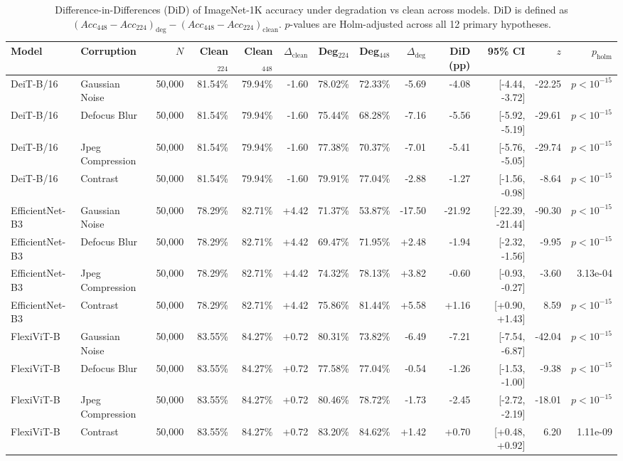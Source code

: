 \begin{table}[t]
\centering
\small
\begin{tabular}{llrrrrrrrrrrr}
\toprule
Model & Corruption & $N$ & Clean$_{224}$ & Clean$_{448}$ & $\Delta_{\text{clean}}$ & Deg$_{224}$ & Deg$_{448}$ & $\Delta_{\text{deg}}$ & DiD (pp) & 95\% CI & $z$ & $p_{\text{holm}}$ \\
\midrule
DeiT-B/16 & Gaussian Noise & 50,000 & 81.54\% & 79.94\% & -1.60 & 78.02\% & 72.33\% & -5.69 & -4.08 & [-4.44, -3.72] & -22.25 & $p < 10^{-15}$ \\
DeiT-B/16 & Defocus Blur & 50,000 & 81.54\% & 79.94\% & -1.60 & 75.44\% & 68.28\% & -7.16 & -5.56 & [-5.92, -5.19] & -29.61 & $p < 10^{-15}$ \\
DeiT-B/16 & Jpeg Compression & 50,000 & 81.54\% & 79.94\% & -1.60 & 77.38\% & 70.37\% & -7.01 & -5.41 & [-5.76, -5.05] & -29.74 & $p < 10^{-15}$ \\
DeiT-B/16 & Contrast & 50,000 & 81.54\% & 79.94\% & -1.60 & 79.91\% & 77.04\% & -2.88 & -1.27 & [-1.56, -0.98] & -8.64 & $p < 10^{-15}$ \\
EfficientNet-B3 & Gaussian Noise & 50,000 & 78.29\% & 82.71\% & +4.42 & 71.37\% & 53.87\% & -17.50 & -21.92 & [-22.39, -21.44] & -90.30 & $p < 10^{-15}$ \\
EfficientNet-B3 & Defocus Blur & 50,000 & 78.29\% & 82.71\% & +4.42 & 69.47\% & 71.95\% & +2.48 & -1.94 & [-2.32, -1.56] & -9.95 & $p < 10^{-15}$ \\
EfficientNet-B3 & Jpeg Compression & 50,000 & 78.29\% & 82.71\% & +4.42 & 74.32\% & 78.13\% & +3.82 & -0.60 & [-0.93, -0.27] & -3.60 & 3.13e-04 \\
EfficientNet-B3 & Contrast & 50,000 & 78.29\% & 82.71\% & +4.42 & 75.86\% & 81.44\% & +5.58 & +1.16 & [+0.90, +1.43] & 8.59 & $p < 10^{-15}$ \\
FlexiViT-B & Gaussian Noise & 50,000 & 83.55\% & 84.27\% & +0.72 & 80.31\% & 73.82\% & -6.49 & -7.21 & [-7.54, -6.87] & -42.04 & $p < 10^{-15}$ \\
FlexiViT-B & Defocus Blur & 50,000 & 83.55\% & 84.27\% & +0.72 & 77.58\% & 77.04\% & -0.54 & -1.26 & [-1.53, -1.00] & -9.38 & $p < 10^{-15}$ \\
FlexiViT-B & Jpeg Compression & 50,000 & 83.55\% & 84.27\% & +0.72 & 80.46\% & 78.72\% & -1.73 & -2.45 & [-2.72, -2.19] & -18.01 & $p < 10^{-15}$ \\
FlexiViT-B & Contrast & 50,000 & 83.55\% & 84.27\% & +0.72 & 83.20\% & 84.62\% & +1.42 & +0.70 & [+0.48, +0.92] & 6.20 & 1.11e-09 \\
\bottomrule
\end{tabular}
\caption{Difference-in-Differences (DiD) of ImageNet-1K accuracy under degradation vs clean across models. DiD is defined as $(Acc_{448} - Acc_{224})_{\text{deg}} - (Acc_{448} - Acc_{224})_{\text{clean}}$. $p$-values are Holm-adjusted across all 12 primary hypotheses.}
\label{tab:table1_did}
\end{table}
